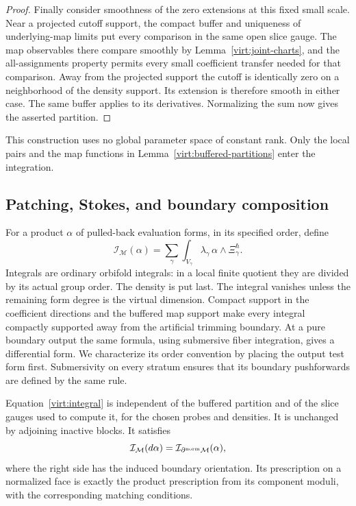 \begin{proof}
Finally consider smoothness of the zero extensions at this fixed small
scale.  Near a projected cutoff support, the compact buffer and
uniqueness of underlying-map limits put every comparison in the same
open slice gauge.  The map observables there compare smoothly by
Lemma~\ref{virt:joint-charts}, and the all-assignments property permits
every small coefficient transfer needed for that comparison.  Away
from the projected support the cutoff is identically zero on a
neighborhood of the density support.  Its extension is therefore
smooth in either case.  The same buffer applies to its derivatives.
Normalizing the sum now gives the asserted partition.
\end{proof}

This construction uses no global parameter space of constant rank.
Only the local pairs and the map functions in
Lemma~\ref{virt:buffered-partitions} enter the integration.

\subsection{Patching, Stokes, and boundary composition}

For a product $\alpha$ of pulled-back evaluation forms, in its specified
order, define
\begin{equation}\label{virt:integral}
 \mathcal I_{\mathcal M}(\alpha)
   =\sum_\gamma\int_{V_\gamma}
           \lambda_\gamma\,\alpha\wedge\Xi_\gamma^\hbar.
\end{equation}
Integrals are ordinary orbifold integrals: in a local finite quotient
they are divided by its actual group order.  The density is put last.
The integral vanishes unless the remaining form degree is the virtual
dimension.  Compact support in the coefficient directions and the
buffered map support make every integral compactly supported away from
the artificial trimming boundary.  At a pure boundary output the same
formula, using submersive fiber integration, gives a differential form.
We characterize its order convention by placing the output test form
first.  Submersivity on every stratum ensures that its boundary
pushforwards are defined by the same rule.

\begin{lemma}\label{virt:patching}
Equation~\eqref{virt:integral} is independent of the buffered partition
and of the slice gauges used to compute it, for the chosen probes and
densities.  It is unchanged by adjoining inactive blocks.  It satisfies
\[
 \mathcal I_{\mathcal M}(d\alpha)
       =\mathcal I_{\partial^{\rm norm}\mathcal M}(\alpha),
\]
where the right side has the induced boundary orientation.  Its
prescription on a normalized face is exactly the product prescription
from its component moduli, with the corresponding matching conditions.
\end{lemma}

